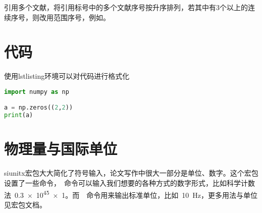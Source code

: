 引用多个文献，将引用标号中的多个文献序号按升序排列，若其中有3个以上的连续序号，则改用范围序号，例如\cite{1979Prospect,2010An,1989The}。

\section{代码}
使用lstlisting环境可以对代码进行格式化
\begin{lstlisting}[language = Python]
import numpy as np

a = np.zeros((2,2))
print(a)
\end{lstlisting}

\section{物理量与国际单位}
siunitx宏包大大简化了符号输入，论文写作中很大一部分是单位、数字。这个宏包设置了一些命令，\concise{\num}~命令可以输入我们想要的各种方式的数字形式，比如科学计数法~\num{.3e45x1}。而~\concise{\SI}~命令用来输出标准单位，比如~\SI{10}{Hz}，更多用法与单位见宏包文档。